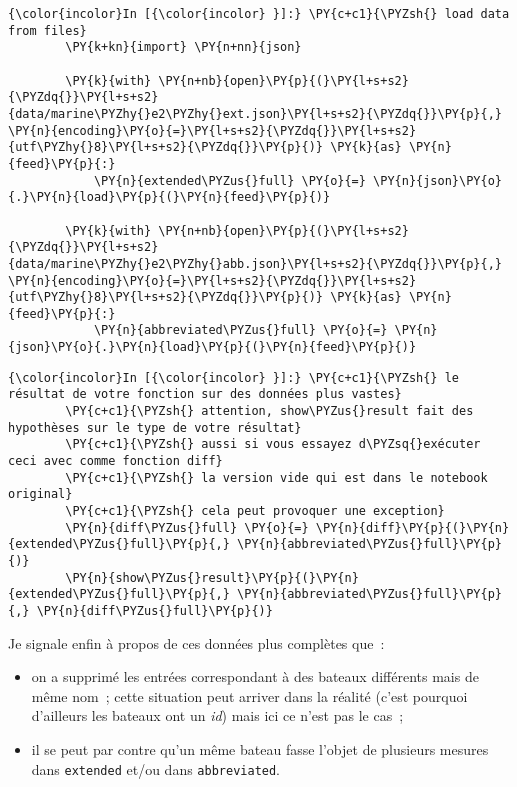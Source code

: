    \begin{Verbatim}[commandchars=\\\{\}]
{\color{incolor}In [{\color{incolor} }]:} \PY{c+c1}{\PYZsh{} load data from files}
        \PY{k+kn}{import} \PY{n+nn}{json}
        
        \PY{k}{with} \PY{n+nb}{open}\PY{p}{(}\PY{l+s+s2}{\PYZdq{}}\PY{l+s+s2}{data/marine\PYZhy{}e2\PYZhy{}ext.json}\PY{l+s+s2}{\PYZdq{}}\PY{p}{,} \PY{n}{encoding}\PY{o}{=}\PY{l+s+s2}{\PYZdq{}}\PY{l+s+s2}{utf\PYZhy{}8}\PY{l+s+s2}{\PYZdq{}}\PY{p}{)} \PY{k}{as} \PY{n}{feed}\PY{p}{:}
            \PY{n}{extended\PYZus{}full} \PY{o}{=} \PY{n}{json}\PY{o}{.}\PY{n}{load}\PY{p}{(}\PY{n}{feed}\PY{p}{)}
        
        \PY{k}{with} \PY{n+nb}{open}\PY{p}{(}\PY{l+s+s2}{\PYZdq{}}\PY{l+s+s2}{data/marine\PYZhy{}e2\PYZhy{}abb.json}\PY{l+s+s2}{\PYZdq{}}\PY{p}{,} \PY{n}{encoding}\PY{o}{=}\PY{l+s+s2}{\PYZdq{}}\PY{l+s+s2}{utf\PYZhy{}8}\PY{l+s+s2}{\PYZdq{}}\PY{p}{)} \PY{k}{as} \PY{n}{feed}\PY{p}{:}
            \PY{n}{abbreviated\PYZus{}full} \PY{o}{=} \PY{n}{json}\PY{o}{.}\PY{n}{load}\PY{p}{(}\PY{n}{feed}\PY{p}{)}
\end{Verbatim}


    \begin{Verbatim}[commandchars=\\\{\}]
{\color{incolor}In [{\color{incolor} }]:} \PY{c+c1}{\PYZsh{} le résultat de votre fonction sur des données plus vastes}
        \PY{c+c1}{\PYZsh{} attention, show\PYZus{}result fait des hypothèses sur le type de votre résultat}
        \PY{c+c1}{\PYZsh{} aussi si vous essayez d\PYZsq{}exécuter ceci avec comme fonction diff}
        \PY{c+c1}{\PYZsh{} la version vide qui est dans le notebook original}
        \PY{c+c1}{\PYZsh{} cela peut provoquer une exception}
        \PY{n}{diff\PYZus{}full} \PY{o}{=} \PY{n}{diff}\PY{p}{(}\PY{n}{extended\PYZus{}full}\PY{p}{,} \PY{n}{abbreviated\PYZus{}full}\PY{p}{)}
        \PY{n}{show\PYZus{}result}\PY{p}{(}\PY{n}{extended\PYZus{}full}\PY{p}{,} \PY{n}{abbreviated\PYZus{}full}\PY{p}{,} \PY{n}{diff\PYZus{}full}\PY{p}{)}
\end{Verbatim}


    Je signale enfin à propos de ces données plus complètes que~:
    
\begin{itemize}
	\item 
	on a supprimé les entrées correspondant à des bateaux différents mais de même
	nom~; cette situation peut arriver dans la réalité (c'est pourquoi
	d'ailleurs les bateaux ont un \emph{id}) mais ici ce n'est pas le cas~;
	\item
	il se peut par contre qu'un même bateau fasse l'objet de plusieurs
	mesures dans \texttt{extended} et/ou dans \texttt{abbreviated}.
\end{itemize}	